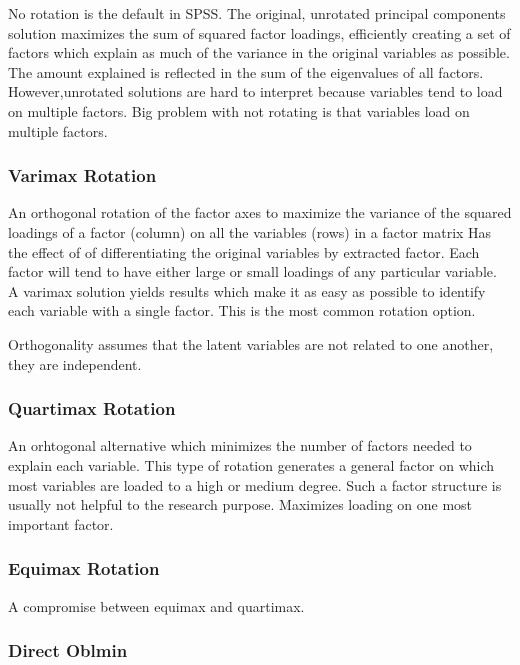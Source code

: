 \documentclass[]{book}
\theoremstyle{definition}
\theoremstyle{definition}
\theoremstyle{definition}
\theoremstyle{remark}
\begin{document}
No rotation is the default in SPSS. The original, unrotated principal
components solution maximizes the sum of squared factor loadings,
efficiently creating a set of factors which explain as much of the
variance in the original variables as possible. The amount explained is
reflected in the sum of the eigenvalues of all factors.
However,unrotated solutions are hard to interpret because variables tend
to load on multiple factors. Big problem with not rotating is that
variables load on multiple factors.

\subsubsection{Varimax Rotation}\label{varimax-rotation}

An orthogonal rotation of the factor axes to maximize the variance of
the squared loadings of a factor (column) on all the variables (rows) in
a factor matrix Has the effect of of differentiating the original
variables by extracted factor. Each factor will tend to have either
large or small loadings of any particular variable. A varimax solution
yields results which make it as easy as possible to identify each
variable with a single factor. This is the most common rotation option.

Orthogonality assumes that the latent variables are not related to one
another, they are independent.

\subsubsection{Quartimax Rotation}\label{quartimax-rotation}

An orhtogonal alternative which minimizes the number of factors needed
to explain each variable. This type of rotation generates a general
factor on which most variables are loaded to a high or medium degree.
Such a factor structure is usually not helpful to the research purpose.
Maximizes loading on one most important factor.

\subsubsection{Equimax Rotation}\label{equimax-rotation}

A compromise between equimax and quartimax.

\subsubsection{Direct Oblmin}\label{direct-oblmin}
\end{document}
